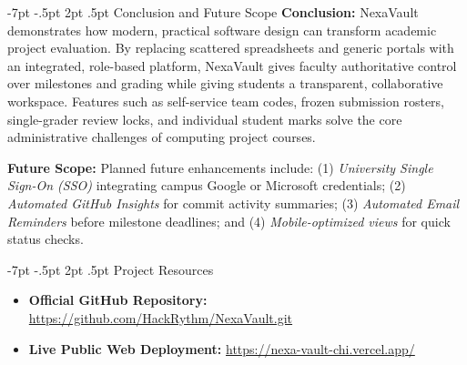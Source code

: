 \documentclass[11pt,a4paper]{article}
\makeatletter
\renewcommand\section{\@startsection {section}{1}{\z@}%
  {-7pt \@plus -1.5pt \@minus -.5pt}%
  {2pt \@plus .5pt}%
  {\normalfont\large\bfseries\color{nexaNavy}}}
\makeatother
\begin{document}
\section{Conclusion and Future Scope}
\textbf{Conclusion:} NexaVault demonstrates how modern, practical software design can transform academic project evaluation. By replacing scattered spreadsheets and generic portals with an integrated, role-based platform, NexaVault gives faculty authoritative control over milestones and grading while giving students a transparent, collaborative workspace. Features such as self-service team codes, frozen submission rosters, single-grader review locks, and individual student marks solve the core administrative challenges of computing project courses.

\textbf{Future Scope:} Planned future enhancements include: (1) \textit{University Single Sign-On (SSO)} integrating campus Google or Microsoft credentials; (2) \textit{Automated GitHub Insights} for commit activity summaries; (3) \textit{Automated Email Reminders} before milestone deadlines; and (4) \textit{Mobile-optimized views} for quick status checks.

\section{Project Resources}
\begin{itemize}
  \setlength{\itemsep}{0pt}\setlength{\parskip}{0pt}
  \item \textbf{Official GitHub Repository:} \url{https://github.com/HackRythm/NexaVault.git}
  \item \textbf{Live Public Web Deployment:} \url{https://nexa-vault-chi.vercel.app/}
\end{itemize}
\end{document}
